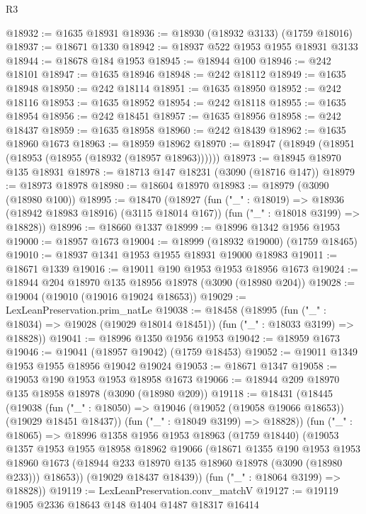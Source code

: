\begin{lexlean}{R3}
\begin{coremodule}
@18932 := @1635 @18931
@18936 := @18930 (@18932 @3133) (@1759 @18016)
@18937 := @18671 @1330
@18942 := @18937 @522 @1953 @1955 @18931 @3133
@18944 := @18678 @184 @1953
@18945 := @18944 @100
@18946 := @242 @18101
@18947 := @1635 @18946
@18948 := @242 @18112
@18949 := @1635 @18948
@18950 := @242 @18114
@18951 := @1635 @18950
@18952 := @242 @18116
@18953 := @1635 @18952
@18954 := @242 @18118
@18955 := @1635 @18954
@18956 := @242 @18451
@18957 := @1635 @18956
@18958 := @242 @18437
@18959 := @1635 @18958
@18960 := @242 @18439
@18962 := @1635 @18960 @1673
@18963 := @18959 @18962
@18970 := @18947 (@18949 (@18951 (@18953 (@18955 (@18932 (@18957 @18963))))))
@18973 := @18945 @18970 @135 @18931
@18978 := @18713 @147 @18231 (@3090 (@18716 @147))
@18979 := @18973 @18978
@18980 := @18604 @18970
@18983 := @18979 (@3090 (@18980 @100))
@18995 := @18470
    (@18927
      (fun ("_" : @18019) => @18936 (@18942 @18983 @18916) (@3115 @18014 @167))
      (fun ("_" : @18018 @3199) => @18828))
@18996 := @18660 @1337
@18999 := @18996 @1342 @1956 @1953
@19000 := @18957 @1673
@19004 := @18999 (@18932 @19000) (@1759 @18465)
@19010 := @18937 @1341 @1953 @1955 @18931 @19000 @18983
@19011 := @18671 @1339
@19016 := @19011 @190 @1953 @1953 @18956 @1673
@19024 := @18944 @204 @18970 @135 @18956 @18978 (@3090 (@18980 @204))
@19028 := @19004 (@19010 (@19016 @19024 @18653))
@19029 := LexLeanPreservation.prim_natLe
@19038 := @18458
    (@18995
      (fun ("_" : @18034) => @19028 (@19029 @18014 @18451))
      (fun ("_" : @18033 @3199) => @18828))
@19041 := @18996 @1350 @1956 @1953
@19042 := @18959 @1673
@19046 := @19041 (@18957 @19042) (@1759 @18453)
@19052 := @19011 @1349 @1953 @1955 @18956 @19042 @19024
@19053 := @18671 @1347
@19058 := @19053 @190 @1953 @1953 @18958 @1673
@19066 := @18944 @209 @18970 @135 @18958 @18978 (@3090 (@18980 @209))
@19118 := @18431
    (@18445
      (@19038
        (fun ("_" : @18050) => @19046 (@19052 (@19058 @19066 @18653)) (@19029 @18451 @18437))
        (fun ("_" : @18049 @3199) => @18828))
      (fun ("_" : @18065) =>
      @18996
        @1358
        @1956
        @1953
        @18963
        (@1759 @18440)
        (@19053
          @1357
          @1953
          @1955
          @18958
          @18962
          @19066
          (@18671
            @1355
            @190
            @1953
            @1953
            @18960
            @1673
            (@18944 @233 @18970 @135 @18960 @18978 (@3090 (@18980 @233)))
            @18653))
        (@19029 @18437 @18439))
      (fun ("_" : @18064 @3199) => @18828))
@19119 := LexLeanPreservation.conv_matchV
@19127 := @19119 @1905 @2336 @18643 @148 @1404 @1487 @18317 @16414

\end{coremodule}
\end{lexlean}

